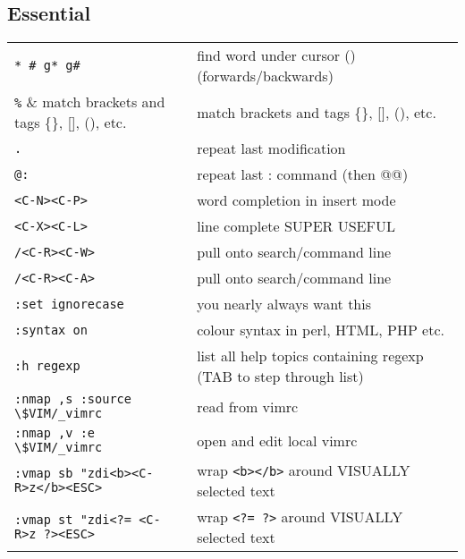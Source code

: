 \subsection{Essential}
\begin{center}
\begin{longtable}{l|l}
\verb!* # g* g#! & find word under cursor () (forwards/backwards)\\
\verb!%! & match brackets and tags \{\}, [], (), etc. \\
\verb!.! & repeat last modification \\
\verb!@:! & repeat last : command (then @@)\\
\verb!<C-N><C-P>! & word completion in insert mode\\
\verb!<C-X><C-L>! & line complete SUPER USEFUL\\
\verb!/<C-R><C-W>! & pull onto search/command line\\
\verb!/<C-R><C-A>! & pull onto search/command line\\
\verb!:set ignorecase! & you nearly always want this\\
\verb!:syntax on! & colour syntax in perl, HTML, PHP etc. \\
\verb!:h regexp! & list all help topics containing regexp (TAB to step through list)\\
\verb!:nmap ,s :source \$VIM/_vimrc! & read from vimrc\\
\verb!:nmap ,v :e \$VIM/_vimrc! & open and edit local vimrc \\
\verb!:vmap sb "zdi<b><C-R>z</b><ESC>! & wrap \verb!<b></b>! around VISUALLY selected text\\
\verb!:vmap st "zdi<?= <C-R>z ?><ESC>! & wrap \verb!<?= ?>! around VISUALLY selected text
\end{longtable}
\end{center}
